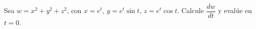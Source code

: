 Sea $w = x^2 + y^2 + z^2$, con $x = e^t$, $y = e^t \sin t$, $z = e^t \cos t$. Calcule $\dfrac{dw}{dt}$ y evalúe en $t = 0$.
